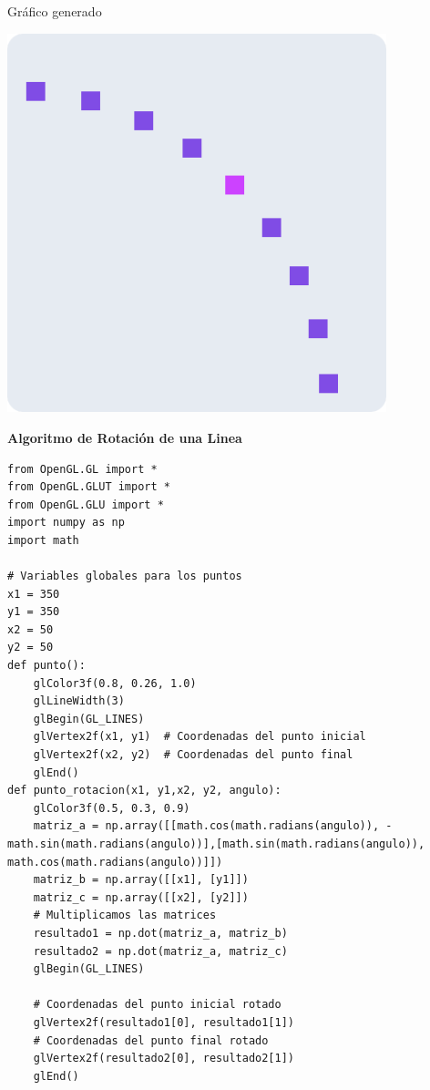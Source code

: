 \documentclass[a4paper]{article}
\begin{document}
Gráfico generado 
\begin{center}
\includegraphics[width=11cm]{src/1.png}
\end{center}
\newpage
\Large{\textbf{Algoritmo de Rotación de una Linea}}\\[-0.4cm]
\begin{center}
\begin{mycodeboxl}
\begin{lstlisting}
from OpenGL.GL import *
from OpenGL.GLUT import *
from OpenGL.GLU import *
import numpy as np
import math

# Variables globales para los puntos
x1 = 350
y1 = 350
x2 = 50
y2 = 50
def punto():
    glColor3f(0.8, 0.26, 1.0)
    glLineWidth(3)
    glBegin(GL_LINES)
    glVertex2f(x1, y1)  # Coordenadas del punto inicial
    glVertex2f(x2, y2)  # Coordenadas del punto final
    glEnd()
def punto_rotacion(x1, y1,x2, y2, angulo):
    glColor3f(0.5, 0.3, 0.9)
    matriz_a = np.array([[math.cos(math.radians(angulo)), -math.sin(math.radians(angulo))],[math.sin(math.radians(angulo)), math.cos(math.radians(angulo))]])
    matriz_b = np.array([[x1], [y1]])
    matriz_c = np.array([[x2], [y2]])
    # Multiplicamos las matrices
    resultado1 = np.dot(matriz_a, matriz_b)
    resultado2 = np.dot(matriz_a, matriz_c)
    glBegin(GL_LINES)

    # Coordenadas del punto inicial rotado
    glVertex2f(resultado1[0], resultado1[1])  
    # Coordenadas del punto final rotado 
    glVertex2f(resultado2[0], resultado2[1])
    glEnd()
\end{lstlisting}
\end{mycodeboxl}
\end{center}
\end{document}
